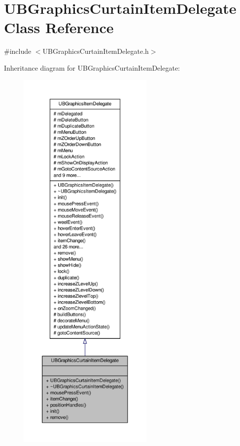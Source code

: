 \hypertarget{class_u_b_graphics_curtain_item_delegate}{\section{U\-B\-Graphics\-Curtain\-Item\-Delegate Class Reference}
\label{de/dbb/class_u_b_graphics_curtain_item_delegate}
}


{\ttfamily \#include $<$U\-B\-Graphics\-Curtain\-Item\-Delegate.\-h$>$}



Inheritance diagram for U\-B\-Graphics\-Curtain\-Item\-Delegate\-:
\nopagebreak
\begin{figure}[H]
\begin{center}
\leavevmode
\includegraphics[height=550pt]{d2/df1/class_u_b_graphics_curtain_item_delegate__inherit__graph}
\end{center}
\end{figure}


